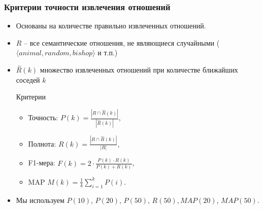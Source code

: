 \documentclass{beamer}
\begin{document}
\begin{frame}
\frametitle{Критерии точности извлечения отношений}

\begin{itemize}
  
  \item Основаны на количестве правильно извлеченных отношений.
  

\item $R$ -- все семантические отношения, не являющиеся случайными ($\langle animal, random, bishop \rangle$ и т.п.)

\item $\hat{R}(k)$ множество извлеченных отношений при количестве ближайших соседей $k$

\begin{block}{Критерии}

	
	\begin{itemize}
		\item Точность: $P(k)=$$\frac{|R \cap \hat{R}(k)|}{|\hat{R}(k)|}$,
		\item Полнота: $R(k)=$$\frac{|R \cap \hat{R}(k)|}{|R|}$,
		\item F1-мера: $F(k)= 2 \cdot \frac{P(k) \cdot R(k)}{P(k) + R(k)}$,
		\item MAP $M(k) = \frac{1}{k}\sum^{k}_{i=1}P(i)$.
	\end{itemize}	
	\end{block}

\item Мы используем $P(10)$, $P(20)$, $P(50)$, $R(50),MAP(20)$, $MAP(50)$.
	

\end{itemize}
	
	
\end{frame}
\end{document}
